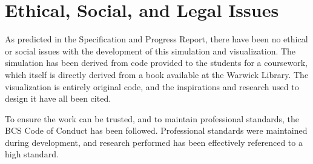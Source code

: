 
\chapter{Ethical, Social, and Legal Issues}
\label{sec:EthicalSocialLegal} 
As predicted in the Specification and Progress Report, there have been no ethical or social issues with the development of this simulation and visualization.
The simulation has been derived from code provided to the students for a coursework\cite{modules:CS257Coursework}, which itself is directly derived from a book\cite{book:griebel1998numerical} available at the Warwick Library.
The visualization is entirely original code, and the inspirations and research used to design it have all been cited.


To ensure the work can be trusted, and to maintain professional standards, the BCS Code of Conduct\cite{ethics:BCSCodeOfConduct} has been followed.
Professional standards were maintained during development, and research performed has been effectively referenced to a high standard.

